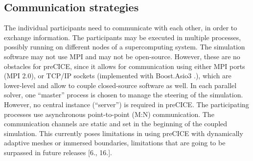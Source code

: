 \subsection{Communication strategies}
\label{sec:pc-comm}

The individual participants need to communicate with each other, in order to exchange
information. The participants may be executed in multiple processes, possibly running on
different nodes of a supercomputing system. The simulation software may not use MPI and
may not be open-source. However, these are no obstacles for preCICE, since it allows for
communication using either MPI ports (MPI 2.0), or TCP/IP sockets (implemented with
Boost.Asio3
.), which are lower-level and allow to couple closed-source software as well.
In each parallel solver, one “master” process is chosen to manage the steering of the simulation.
However, no central instance (“server”) is required in preCICE. The participating
processes use asynchronous point-to-point (M:N) communication. The communication
channels are static and set in the beginning of the coupled simulation. This currently poses
limitations in using preCICE with dynamically adaptive meshes or immersed boundaries,
limitations that are going to be surpassed in future releases [6., 16.].


